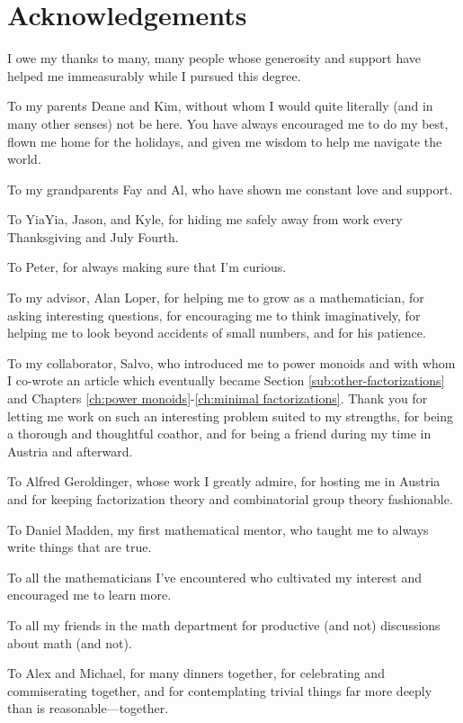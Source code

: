 \chapter{Acknowledgements}
I owe my thanks to many, many people whose generosity and support have helped me immeasurably while I pursued this degree.


To my parents Deane and Kim, without whom I would quite literally (and in many other senses) not be here.
You have always encouraged me to do my best, flown me home for the holidays, and given me wisdom to help me navigate the world.

To my grandparents Fay and Al, who have shown me constant love and support.

To YiaYia, Jason, and Kyle, for hiding me safely away from work every Thanksgiving and July Fourth.

To Peter, for always making sure that I'm curious.

To my advisor, Alan Loper, for helping me to grow as a mathematician, for asking interesting questions, for encouraging me to think imaginatively, for helping me to look beyond accidents of small numbers, and for his patience.

To my collaborator, Salvo, who introduced me to power monoids and with whom I co-wrote an article which eventually became Section \ref{sub:other-factorizations} and Chapters \ref{ch:power monoids}-\ref{ch:minimal factorizations}.
Thank you for letting me work on such an interesting problem suited to my strengths, for being a thorough and thoughtful coathor, and for being a friend during my time in Austria and afterward.

To Alfred Geroldinger, whose work I greatly admire, for hosting me in Austria and for keeping factorization theory and combinatorial group theory fashionable.

To Daniel Madden, my first mathematical mentor, who taught me to always write things that are true.

To all the mathematicians I've encountered who cultivated my interest and encouraged me to learn more.

To all my friends in the math department for productive (and not) discussions about math (and not).

To Alex and Michael, for many dinners together, for celebrating and commiserating together, and for contemplating trivial things far more deeply than is reasonable---together.

